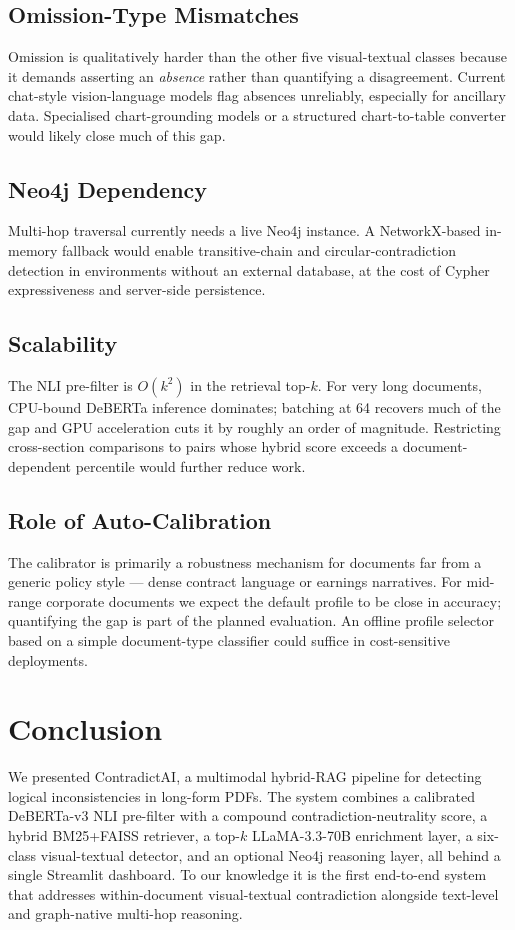 \documentclass[conference]{IEEEtran}
\begin{document}
\subsection{Omission-Type Mismatches}
Omission is qualitatively harder than the other five visual-textual classes because it demands asserting an \emph{absence} rather than quantifying a disagreement. Current chat-style vision-language models flag absences unreliably, especially for ancillary data. Specialised chart-grounding models or a structured chart-to-table converter would likely close much of this gap.

\subsection{Neo4j Dependency}
Multi-hop traversal currently needs a live Neo4j instance. A NetworkX-based in-memory fallback would enable transitive-chain and circular-contradiction detection in environments without an external database, at the cost of Cypher expressiveness and server-side persistence.

\subsection{Scalability}
The NLI pre-filter is $O(k^2)$ in the retrieval top-$k$. For very long documents, CPU-bound DeBERTa inference dominates; batching at 64 recovers much of the gap and GPU acceleration cuts it by roughly an order of magnitude. Restricting cross-section comparisons to pairs whose hybrid score exceeds a document-dependent percentile would further reduce work.

\subsection{Role of Auto-Calibration}
The calibrator is primarily a robustness mechanism for documents far from a generic policy style --- dense contract language or earnings narratives. For mid-range corporate documents we expect the default profile to be close in accuracy; quantifying the gap is part of the planned evaluation. An offline profile selector based on a simple document-type classifier could suffice in cost-sensitive deployments.

\section{Conclusion}\label{sec:conclusion}
We presented ContradictAI, a multimodal hybrid-RAG pipeline for detecting logical inconsistencies in long-form PDFs. The system combines a calibrated DeBERTa-v3 NLI pre-filter with a compound contradiction-neutrality score, a hybrid BM25+FAISS retriever, a top-$k$ LLaMA-3.3-70B enrichment layer, a six-class visual-textual detector, and an optional Neo4j reasoning layer, all behind a single Streamlit dashboard. To our knowledge it is the first end-to-end system that addresses within-document visual-textual contradiction alongside text-level and graph-native multi-hop reasoning.
\end{document}
